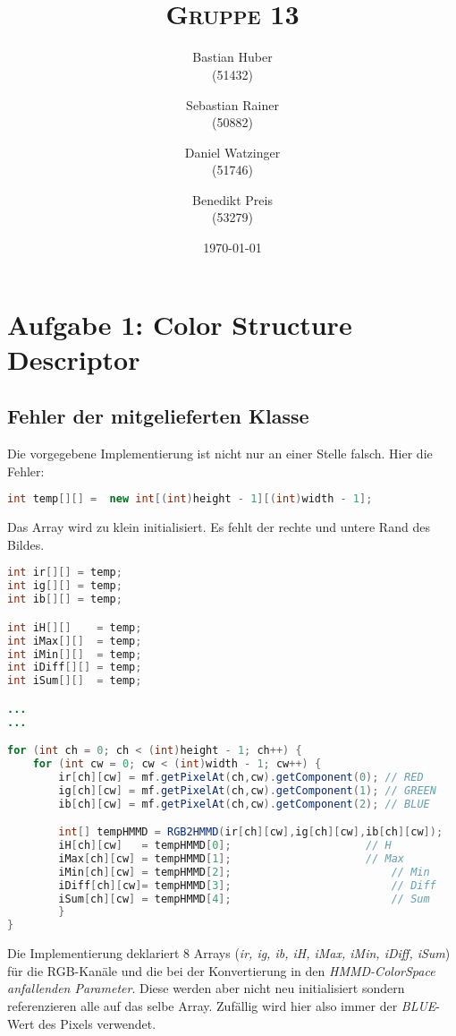 \documentclass{article}
\author{Bastian Huber\\(51432) \and Sebastian Rainer\\(50882) \and Daniel Watzinger\\(51746) \and Benedikt Preis \\(53279)}
\title{\textbf{\huge{\thetitle}}\\\large\textsc{Gruppe 13}}
\date{\today}
\newcommand{\mysection}[1]{\section*{#1} \setcounter{subsection}{0}}
\begin{document}
\hyphenation{}

\maketitle

\pagestyle{fancy}


\mysection{Aufgabe 1: Color Structure Descriptor}
  \subsection{Fehler der mitgelieferten Klasse}
    Die vorgegebene Implementierung ist nicht nur an einer Stelle falsch. Hier die Fehler:
    \begin{lstlisting}[language=Java]
int temp[][] =  new int[(int)height - 1][(int)width - 1];
    \end{lstlisting}
    Das Array wird zu klein initialisiert. Es fehlt der rechte und untere Rand des Bildes.
    
    
    \begin{lstlisting}[language=Java]
int ir[][] = temp;
int ig[][] = temp;
int ib[][] = temp;

int iH[][]    = temp;
int iMax[][]  = temp;
int iMin[][]  = temp;
int iDiff[][] = temp;
int iSum[][]  = temp;

...
...

for (int ch = 0; ch < (int)height - 1; ch++) {
	for (int cw = 0; cw < (int)width - 1; cw++) {
		ir[ch][cw] = mf.getPixelAt(ch,cw).getComponent(0); // RED
		ig[ch][cw] = mf.getPixelAt(ch,cw).getComponent(1); // GREEN
		ib[ch][cw] = mf.getPixelAt(ch,cw).getComponent(2); // BLUE

		int[] tempHMMD = RGB2HMMD(ir[ch][cw],ig[ch][cw],ib[ch][cw]);
		iH[ch][cw]   = tempHMMD[0];						// H
		iMax[ch][cw] = tempHMMD[1];						// Max
		iMin[ch][cw] = tempHMMD[2]; 						// Min
		iDiff[ch][cw]= tempHMMD[3]; 						// Diff
		iSum[ch][cw] = tempHMMD[4]; 						// Sum
		}
}
    \end{lstlisting}
    Die Implementierung deklariert 8 Arrays (\emph{ir, ig, ib, iH, iMax, iMin, iDiff, iSum}) für die RGB-Kanäle und die bei der Konvertierung in den
    \emph{HMMD-ColorSpace anfallenden Parameter}. Diese werden aber nicht neu initialisiert sondern referenzieren alle auf das selbe Array.
    Zufällig wird hier also immer der \emph{BLUE}-Wert des Pixels verwendet.
    
\end{document}

